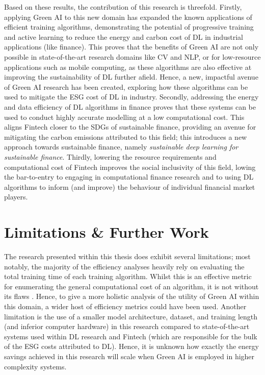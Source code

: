 \documentclass[a4paper, 11pt]{report}
\begin{document}
    Based on these results, the contribution of this research is threefold. Firstly, applying Green AI to this new domain has expanded the known applications of efficient training algorithms, demonstrating the potential of progressive training and active learning to reduce the energy and carbon cost of DL in industrial applications (like finance). This proves that the benefits of Green AI are not only possible in state-of-the-art research domains like CV and NLP, or for low-resource applications such as mobile computing, as these algorithms are also effective at improving the sustainability of DL further afield. Hence, a new, impactful avenue of Green AI research has been created, exploring how these algorithms can be used to mitigate the ESG cost of DL in industry. Secondly, addressing the energy and data efficiency of DL algorithms in finance proves that these systems can be used to conduct highly accurate modelling at a low computational cost. This aligns Fintech closer to the SDGs of sustainable finance, providing an avenue for mitigating the carbon emissions attributed to this field; this introduces a new approach towards sustainable finance, namely \emph{sustainable deep learning for sustainable finance}. Thirdly, lowering the resource requirements and computational cost of Fintech improves the social inclusivity of this field, lowing the bar-to-entry to engaging in computational finance research and to using DL algorithms to inform (and improve) the behaviour of individual financial market players.


    \section{Limitations \& Further Work}

    The research presented within this thesis does exhibit several limitations; most notably, the majority of the efficiency analyses heavily rely on evaluating the total training time of each training algorithm. Whilst this is an effective metric for enumerating the general computational cost of an algorithm, it is not without its flaws \citep{schwartz-2019}. Hence, to give a more holistic analysis of the utility of Green AI within this domain, a wider host of efficiency metrics could have been used. Another limitation is the use of a smaller model architecture, dataset, and training length (and inferior computer hardware) in this research compared to state-of-the-art systems used within DL research and Fintech (which are responsible for the bulk of the ESG costs attributed to DL). Hence, it is unknown how exactly the energy savings achieved in this research will scale when Green AI is employed in higher complexity systems. 
\end{document}
